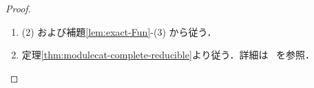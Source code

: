 \documentclass[TQFT_main]{subfiles}
\begin{document}
\begin{proof}
\begin{enumerate}
        　ここで，\hyperref[def:adjoint]{随伴} $F^* \dashv F$ の\hyperref[def:unit-counit-adjunction]{unit, counit}によりそれぞれ自然変換
        \begin{align}
            \eta^F &\in \Hom{\LModFun{\Cat{C}} (\Cat{M},\, \Cat{M})} (\Id_{\Cat{M}},\, F \otimes F^*), \\
            \epsilon^F &\in \Hom{\LModFun{\Cat{C}} (\Cat{M},\, \Cat{M})} (F^* \otimes F,\, \Id_{\Cat{M}})
        \end{align}
        が定まる．
        いま，3つ組 $(F^*,\, \eta^F,\, \epsilon^F)$ が $F$ の\hyperref[redef:dual]{左双対}になっていることを示そう．
        実際，\hyperref[prop:unit-counit]{\textsf{\textbf{(triangle identity)}}}より
        \begin{align}
            \Id_F 
            &= ( F \cdot \epsilon^F ) \circ (\eta^F \cdot F) \\
            &= (\Id_F \cdot \Id_{\Cat{M}}) \circ ( F \cdot \epsilon^F ) \circ (\eta^F \cdot F) \circ (\Id_{\Cat{M}} \cdot \Id_F) \\
            &= (\Id_F \otimes \epsilon^F) \circ (\eta^F \otimes \Id_F) , \\
            \Id_{F^*} 
            &= \bigl( \epsilon^F \cdot F^*\bigr) \circ (F^* \cdot \eta^F) \\
            &= \bigl( \epsilon^F \cdot F^*\bigr) \circ (\Id_{\Cat{M}} \cdot \Id_{F^*}) \circ (\Id_{F^*} \cdot \Id_{\Cat{M}}) \circ (F^* \cdot \eta^F) \\
            &= (\epsilon^F \otimes \Id_{F^*}) \circ (\Id_{F^*} \otimes \eta^F)
        \end{align}
        と計算できるので，\hyperref[redef:dual]{\textsf{\textbf{(zig-zag-identity)}}}が示された．
        同様に\hyperref[def:adjoint]{右随伴} $F \vdash \rdual{F}$ に関する\hyperref[def:unit-counit-adjunction]{unit, counit}をとることで，$F$ の\hyperref[redef:dual]{右双対}が与えられる．
        \item (2) および補題\ref{lem:exact-Fun}-(3) から従う．
        \item 定理\ref{thm:modulecat-complete-reducible}より従う．詳細は~\cite[LEMMA 7.12.6.]{etingof2015tensor} を参照．
    \end{enumerate}
\end{proof}
\end{document}
